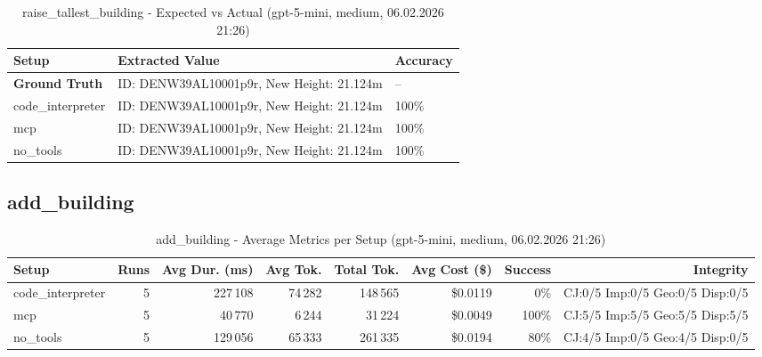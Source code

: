 \documentclass[a4paper,11pt]{article}
\begin{document}
\begin{table}[H]
\centering
\scriptsize
\caption{raise\_tallest\_building - Expected vs Actual (gpt-5-mini, medium, 06.02.2026 21:26)}
\begin{tabular}{l l l}
\toprule
Setup & Extracted Value & Accuracy \\
\midrule
\textbf{Ground Truth} & ID: DENW39AL10001p9r, New Height: 21.124m & -- \\
\midrule
code\_interpreter & ID: DENW39AL10001p9r, New Height: 21.124m & 100\% \\
mcp & ID: DENW39AL10001p9r, New Height: 21.124m & 100\% \\
no\_tools & ID: DENW39AL10001p9r, New Height: 21.124m & 100\% \\
\bottomrule
\end{tabular}
\end{table}

\clearpage

\subsection{add\_building}

\begin{table}[H]
\centering
\scriptsize
\caption{add\_building - Average Metrics per Setup (gpt-5-mini, medium, 06.02.2026 21:26)}
\label{tab:combined\_add\_building\_metrics\_20260206}
\begin{tabular}{l r r r r r r r}
\toprule
Setup & Runs & Avg Dur. (ms) & Avg Tok. & Total Tok. & Avg Cost (\$) & Success & Integrity \\
\midrule
code\_interpreter & 5 & 227\,108 & 74\,282 & 148\,565 & \$0.0119 & 0\% & CJ:0/5 Imp:0/5 Geo:0/5 Disp:0/5 \\
mcp & 5 & 40\,770 & 6\,244 & 31\,224 & \$0.0049 & 100\% & CJ:5/5 Imp:5/5 Geo:5/5 Disp:5/5 \\
no\_tools & 5 & 129\,056 & 65\,333 & 261\,335 & \$0.0194 & 80\% & CJ:4/5 Imp:0/5 Geo:4/5 Disp:0/5 \\
\bottomrule
\end{tabular}
\end{table}
\end{document}
